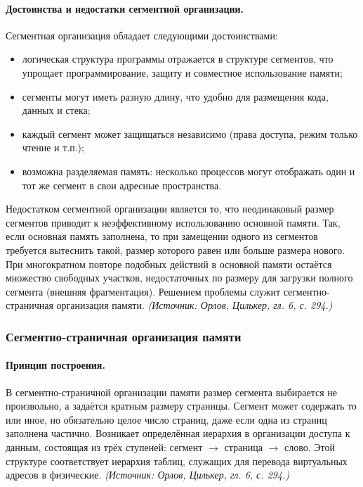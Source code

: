 \documentclass[a4paper,12pt]{article}
\begin{document}
\paragraph{Достоинства и недостатки сегментной организации.}
Сегментная организация обладает следующими достоинствами:
\begin{itemize}
\item логическая структура программы отражается в структуре сегментов, что упрощает программирование, защиту и совместное использование памяти;
\item сегменты могут иметь разную длину, что удобно для размещения кода, данных и стека;
\item каждый сегмент может защищаться независимо (права доступа, режим только чтение и т.п.);
\item возможна разделяемая память: несколько процессов могут отображать один и тот же сегмент в свои адресные пространства.
\end{itemize}
Недостатком сегментной организации является то, что неодинаковый размер сегментов приводит к неэффективному использованию основной памяти. Так, если основная память заполнена, то при замещении одного из сегментов требуется вытеснить такой, размер которого равен или больше размера нового. При многократном повторе подобных действий в основной памяти остаётся множество свободных участков, недостаточных по размеру для загрузки полного сегмента (внешняя фрагментация). Решением проблемы служит сегментно-страничная организация памяти.
\textit{(Источник: Орлов, Цилькер, гл. 6, с. 294.)}

\subsubsection{Сегментно-страничная организация памяти}

\paragraph{Принцип построения.}
В сегментно-страничной организации памяти размер сегмента выбирается не произвольно, а задаётся кратным размеру страницы. Сегмент может содержать то или иное, но обязательно целое число страниц, даже если одна из страниц заполнена частично. Возникает определённая иерархия в организации доступа к данным, состоящая из трёх ступеней: сегмент \(\to\) страница \(\to\) слово. Этой структуре соответствует иерархия таблиц, служащих для перевода виртуальных адресов в физические.
\textit{(Источник: Орлов, Цилькер, гл. 6, с. 294.)}
\end{document}
